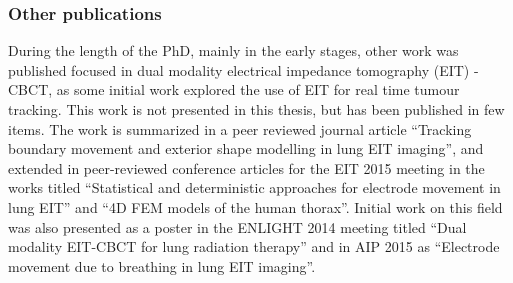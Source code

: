 \subsubsection{Other publications}

During the length of the PhD, mainly in the early stages, other work was published focused in dual modality electrical impedance tomography (EIT) - CBCT, as some initial work explored the use of EIT for real time tumour tracking. This work is not presented in this thesis, but has been published in few items. The work is summarized in a peer reviewed journal article ``Tracking boundary movement and exterior shape modelling in lung EIT imaging''\cite{biguri2015tracking}, and extended in peer-reviewed conference articles for the EIT 2015 meeting in the works titled ``Statistical and deterministic approaches for electrode movement in lung EIT''\cite{biguri2015statistical} and ``4D FEM models of the human thorax''\cite{biguri20154d}. Initial work on this field was also presented as a poster in the ENLIGHT 2014 meeting titled ``Dual modality EIT-CBCT for lung radiation therapy''\cite{biguri2015dual} and in AIP 2015 as ``Electrode movement due to breathing in lung EIT imaging''\cite{biguri2015electrode}.






